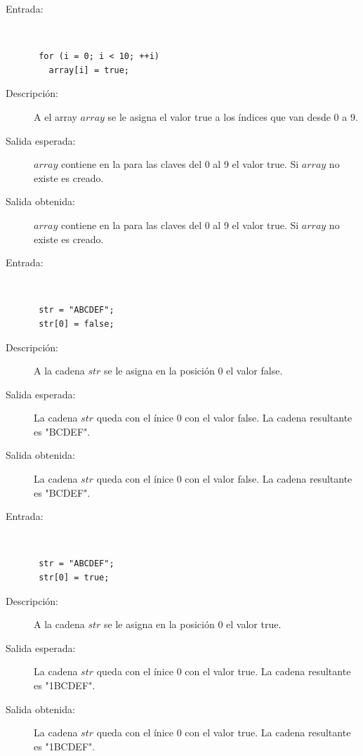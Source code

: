 \begin{framed}
	\begin{description}
		\item [Entrada:] \hfill \\
\begin{lstlisting}
 for (i = 0; i < 10; ++i) 
   array[i] = true;
\end{lstlisting}
		\item [Descripción:] A el array $array$ se le asigna el valor true a los índices que van desde 0 a 9.
		\item [Salida esperada:] $array$ contiene en la para las claves del 0 al 9 el valor true. Si $array$ no existe es creado.
		\item [Salida obtenida:] $array$ contiene en la para las claves del 0 al 9 el valor true. Si $array$ no existe es creado.
	\end{description}
\end{framed}

\begin{framed}
	\begin{description}
		\item [Entrada:] \hfill \\
\begin{lstlisting}
 str = "ABCDEF"; 
 str[0] = false;
\end{lstlisting}
		\item [Descripción:] A la cadena $str$ se le asigna en la posición 0 el valor false.
		\item [Salida esperada:] La cadena $str$ queda con el ínice $0$ con el valor false. La cadena resultante es "BCDEF".
		\item [Salida obtenida:] La cadena $str$ queda con el ínice $0$ con el valor false. La cadena resultante es "BCDEF".
	\end{description}
\end{framed}
\begin{framed}
	\begin{description}
		\item [Entrada:] \hfill \\
\begin{lstlisting}
 str = "ABCDEF"; 
 str[0] = true;
\end{lstlisting}
		\item [Descripción:] A la cadena $str$ se le asigna en la posición 0 el valor true.
		\item [Salida esperada:] La cadena $str$ queda con el ínice $0$ con el valor true. La cadena resultante es "1BCDEF".
		\item [Salida obtenida:] La cadena $str$ queda con el ínice $0$ con el valor true. La cadena resultante es "1BCDEF".
	\end{description}
\end{framed}

